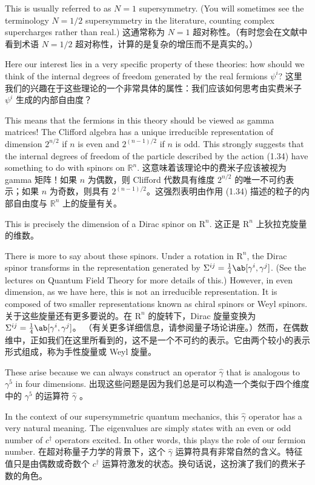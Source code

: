 \documentclass{article}
\begin{document}
This is usually referred to as $N = 1$ supersymmetry. (You will sometimes see the terminology $N = 1 / 2$ supersymmetry in the literature, counting complex supercharges rather than real.)
这通常称为 $N = 1$ 超对称性。（有时您会在文献中看到术语 $N = 1 / 2$ 超对称性，计算的是复杂的增压而不是真实的。）

Here our interest lies in a very specific property of these theories: how should we think of the internal degrees of freedom generated by the real fermions $\psi^{i}$?
这里我们的兴趣在于这些理论的一个非常具体的属性：我们应该如何思考由实费米子 $\psi^{i}$ 生成的内部自由度？

This means that the fermions in this theory should be viewed as gamma matrices! The Cliﬀord algebra has a unique irreducible representation of dimension $2^{n / 2}$ if $n$ is even and $2^{(n - 1) / 2}$ if $n$ is odd. This strongly suggests that the internal degrees of freedom of the particle described by the action (1.34) have something to do with spinors on $\mathbb{R}^n$.
这意味着该理论中的费米子应该被视为 gamma 矩阵！如果 $n$ 为偶数，则 Cliﬀord 代数具有维度 $2^{n / 2}$ 的唯一不可约表示；如果 $n$ 为奇数，则具有 $2^{(n - 1) / 2}$。这强烈表明由作用 (1.34) 描述的粒子的内部自由度与 $\mathbb{R}^n$ 上的旋量有关。

This is precisely the dimension of a Dirac spinor on $\mathrm{R}^{n}$.
这正是 $\mathrm{R}^{n}$ 上狄拉克旋量的维数。

There is more to say about these spinors. Under a rotation in $\mathrm{R}^{n}$, the Dirac spinor transforms in the representation generated by $\Sigma^{ij} = \frac{1}{4} \ab[\gamma^i, \gamma^j]$. (See the lectures on Quantum Field Theory for more details of this.) However, in even dimension, as we have here, this is not an irreducible representation. It is composed of two smaller representations known as chiral spinors or Weyl spinors.
关于这些旋量还有更多要说的。在 $\mathrm{R}^{n}$ 的旋转下，Dirac 旋量变换为 $\Sigma^{ij} = \frac{1}{4} \ab[\gamma^i, \gamma^j]$。 （有关更多详细信息，请参阅量子场论讲座。）然而，在偶数维中，正如我们在这里所看到的，这不是一个不可约的表示。它由两个较小的表示形式组成，称为手性旋量或 Weyl 旋量。

These arise because we can always construct an operator $\hat{\gamma}$ that is analogous to $\gamma^5$ in four dimensions.
出现这些问题是因为我们总是可以构造一个类似于四个维度中的 $\gamma^5$ 的运算符 $\hat{\gamma}$ 。

In the context of our supersymmetric quantum mechanics, this $\hat{\gamma}$ operator has a very natural meaning. The eigenvalues are simply states with an even or odd number of $c^{\dagger}$ operators excited. In other words, this plays the role of our fermion number.
在超对称量子力学的背景下，这个 $\hat{\gamma}$ 运算符具有非常自然的含义。特征值只是由偶数或奇数个 $c^{\dagger}$ 运算符激发的状态。换句话说，这扮演了我们的费米子数的角色。
\end{document}
